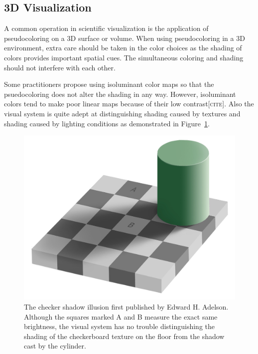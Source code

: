 \documentclass[letterpaper,twocolumn,fleqn]{article}
\newcommand{\fix}[1]{{\color{red}\textsc{[#1]}}}
\begin{document}
\subsection{3D Visualization}

\noindent
A common operation in scientific visualization is the application of
pseudocoloring on a 3D surface or volume. When using pseudocoloring in a 3D
environment, extra care should be taken in the color choices as the shading
of colors provides important spatial cues. The simultaneous coloring and
shading should not interfere with each other.

Some practitioners propose using isoluminant color maps so that the
psuedocoloring does not alter the shading in any way. However, isoluminant
colors tend to make poor linear maps because of their low
contrast\fix{cite}. Also the visual system is quite adept at distinguishing
shading caused by textures and shading caused by lighting conditions as
demonstrated in Figure~\ref{fig:CheckerShadowIllusion}.

\begin{figure}[htb]
  \centering
  \includegraphics[width=\linewidth]{images/CheckerShadowIllusion}
  \caption{The checker shadow illusion first published by Edward H.
    Adelson. Although the squares marked A and B measure the exact same
    brightness, the visual system has no trouble distinguishing the shading
    of the checkerboard texture on the floor from the shadow cast by the
    cylinder.}
  \label{fig:CheckerShadowIllusion}
\end{figure}
\end{document}
